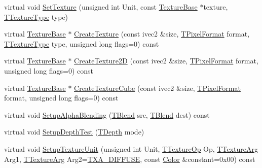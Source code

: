 \begin{DoxyCompactItemize}
\item 
virtual void \hyperlink{class_agmd_1_1_g_l_driver_a0434677977067223edacb20476df942c}{Set\+Texture} (unsigned int Unit, const \hyperlink{class_agmd_1_1_texture_base}{Texture\+Base} $\ast$texture, \hyperlink{namespace_agmd_a7036bece09449a930cfec410f75e85f4}{T\+Texture\+Type} type)
\item 
virtual \hyperlink{class_agmd_1_1_texture_base}{Texture\+Base} $\ast$ \hyperlink{class_agmd_1_1_g_l_driver_a41af189f0e80548bb84b7b9796c12c5f}{Create\+Texture} (const ivec2 \&size, \hyperlink{namespace_agmd_afc48fd9fa5dccb4c5621c052bfd1a7ec}{T\+Pixel\+Format} format, \hyperlink{namespace_agmd_a7036bece09449a930cfec410f75e85f4}{T\+Texture\+Type} type, unsigned long flags=0) const 
\item 
virtual \hyperlink{class_agmd_1_1_texture_base}{Texture\+Base} $\ast$ \hyperlink{class_agmd_1_1_g_l_driver_a3cda774b7cc45aab379127e3ed26e291}{Create\+Texture2\+D} (const ivec2 \&size, \hyperlink{namespace_agmd_afc48fd9fa5dccb4c5621c052bfd1a7ec}{T\+Pixel\+Format} format, unsigned long flags=0) const 
\item 
virtual \hyperlink{class_agmd_1_1_texture_base}{Texture\+Base} $\ast$ \hyperlink{class_agmd_1_1_g_l_driver_aababdfe93bce46a06ac61d78d9afc1c4}{Create\+Texture\+Cube} (const ivec2 \&size, \hyperlink{namespace_agmd_afc48fd9fa5dccb4c5621c052bfd1a7ec}{T\+Pixel\+Format} format, unsigned long flags=0) const 
\item 
virtual void \hyperlink{class_agmd_1_1_g_l_driver_adb9e2cc3d36e5cbdc83d4860cdb569be}{Setup\+Alpha\+Blending} (\hyperlink{namespace_agmd_a5c64d61de9c502c3159b9ce5d653f947}{T\+Blend} src, \hyperlink{namespace_agmd_a5c64d61de9c502c3159b9ce5d653f947}{T\+Blend} dest) const 
\item 
virtual void \hyperlink{class_agmd_1_1_g_l_driver_a80794e6e56cda3f0a4ad31d2deac9e0d}{Setup\+Depth\+Test} (\hyperlink{namespace_agmd_a6bf1c529fabec2b3b33d9d94a032cc6a}{T\+Depth} mode)
\item 
virtual void \hyperlink{class_agmd_1_1_g_l_driver_aab0483f33db17738214722b823c602ca}{Setup\+Texture\+Unit} (unsigned int Unit, \hyperlink{namespace_agmd_aafbdbe5caf9cc8574624faa1943bf5ef}{T\+Texture\+Op} Op, \hyperlink{namespace_agmd_ace3617cd312c454f60b4511e3e873db5}{T\+Texture\+Arg} Arg1, \hyperlink{namespace_agmd_ace3617cd312c454f60b4511e3e873db5}{T\+Texture\+Arg} Arg2=\hyperlink{namespace_agmd_ace3617cd312c454f60b4511e3e873db5a3b6eaeb8bc6375565b086e228263c2ee}{T\+X\+A\+\_\+\+D\+I\+F\+F\+U\+S\+E}, const \hyperlink{class_agmd_utilities_1_1_color}{Color} \&constant=0x00) const 

\end{DoxyCompactItemize}
